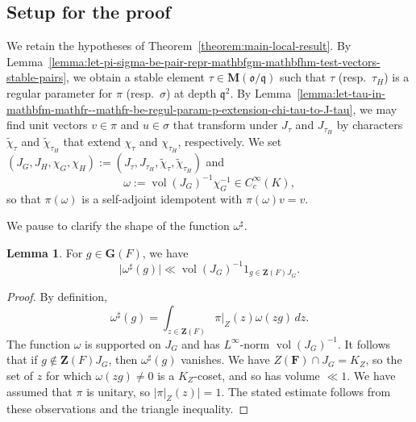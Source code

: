 \documentclass[reqno]{amsart}
\DeclareMathOperator{\vol}{vol}
\theoremstyle{plain} \newtheorem{theorem} {Theorem} \newtheorem{conjecture} {Conjecture} \newtheorem{corollary} [theorem] {Corollary} \newtheorem{proposition} [theorem] {Proposition} \newtheorem{fact} [theorem] {Fact}
\theoremstyle{definition} \newtheorem{definition} [theorem] {Definition}
\theoremstyle{itplain} %
\newtheorem{lemma}[theorem]{Lemma}
\newcommand{\mfq}{\mathfrak{q}}
\begin{document}
\subsection{Setup for the proof}\label{sec:cj4t6ynizh}
We retain the hypotheses of Theorem~\ref{theorem:main-local-result}.  By Lemma~\ref{lemma:let-pi-sigma-be-pair-repr-mathbfgm-mathbfhm-test-vectors-stable-pairs}, we obtain a stable element $\tau \in \mathbf{M}(\mathfrak{o}/\mfq)$ such that $\tau$ (resp.\ $\tau_H$) is a regular parameter for $\pi$ (resp.\ $\sigma$) at depth $\mfq^2$.  By Lemma~\ref{lemma:let-tau-in-mathbfm-mathfr--mathfr-be-regul-param-p-extension-chi-tau-to-J-tau}, we may find unit vectors $v \in \pi$ and $u \in \sigma$ that transform under $J_\tau$ and $J_{\tau_H}$ by characters $\tilde{\chi}_\tau$ and $\tilde{\chi}_{\tau_H}$ that extend $\chi_\tau$ and $\chi_{\tau_H}$, respectively.  We set $(J_G, J_H, \chi_G, \chi_H) := (J_\tau, J_{\tau_H}, \tilde{\chi}_\tau, \tilde{\chi}_{\tau_H})$ and
\begin{equation*}
  \omega := {\vol(J_G)}^{-1} \chi_G^{-1} \in C_c^\infty(K),
\end{equation*}
so that $\pi(\omega)$ is a self-adjoint idempotent with $\pi(\omega) v = v$.

We pause to clarify the shape of the function $\omega ^\sharp$.
\begin{lemma}\label{lemma:g-in-mathbfgf-we-have-begin-lvert-f-sharp-g-rvert-clarify-f-sharp}
  For $g \in \mathbf{G}(F)$, we have
  \begin{equation*}
    \lvert \omega ^\sharp (g) \rvert \ll {\vol(J_G)}^{-1} 1 _{g \in \mathbf{Z}(F) J_G}.
  \end{equation*}
\end{lemma}
\begin{proof}
  By definition,
  \begin{equation*}
    \omega ^\sharp (g) = \int _{z \in \mathbf{Z}(F)} \pi|_{Z}(z) \omega(z g) \, d z.
  \end{equation*}
  The function $\omega$ is supported on $J_G$ and has $L^\infty$-norm ${\vol(J_G)}^{-1}$.  It follows that if $g \notin \mathbf{Z}(F) J_G$, then $\omega ^\sharp (g)$ vanishes.  We have $Z(\mathbf{F}) \cap J_G = K_Z$, so the set of $z$ for which $\omega(z g) \neq 0$ is a $K_Z$-coset, and so has volume $\ll 1$.  We have assumed that $\pi$ is unitary, so $\lvert \pi|_{Z} (z) \rvert = 1$.  The stated estimate follows from these observations and the triangle inequality.
\end{proof}
\end{document}
